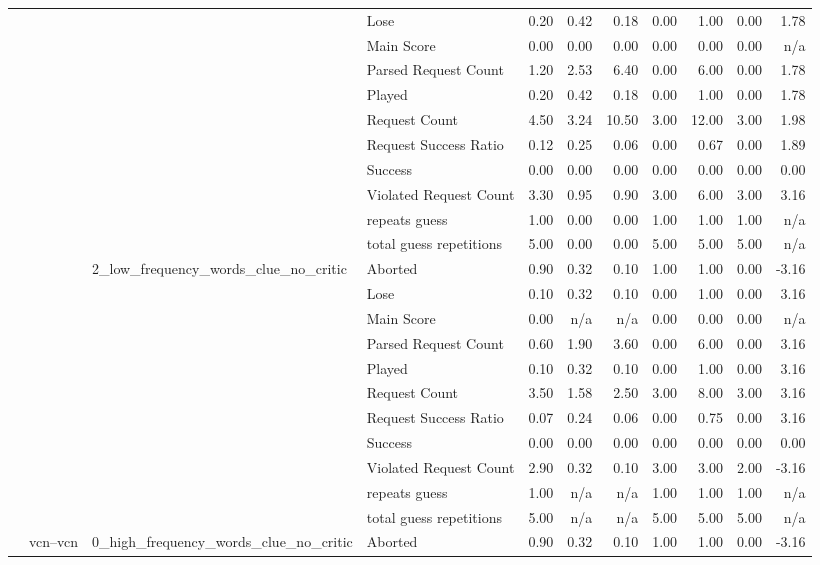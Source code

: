 \begin{tabular}{llllrrrrrrr}
 &  &  & Lose & 0.20 & 0.42 & 0.18 & 0.00 & 1.00 & 0.00 & 1.78 \\
 &  &  & Main Score & 0.00 & 0.00 & 0.00 & 0.00 & 0.00 & 0.00 & n/a \\
 &  &  & Parsed Request Count & 1.20 & 2.53 & 6.40 & 0.00 & 6.00 & 0.00 & 1.78 \\
 &  &  & Played & 0.20 & 0.42 & 0.18 & 0.00 & 1.00 & 0.00 & 1.78 \\
 &  &  & Request Count & 4.50 & 3.24 & 10.50 & 3.00 & 12.00 & 3.00 & 1.98 \\
 &  &  & Request Success Ratio & 0.12 & 0.25 & 0.06 & 0.00 & 0.67 & 0.00 & 1.89 \\
 &  &  & Success & 0.00 & 0.00 & 0.00 & 0.00 & 0.00 & 0.00 & 0.00 \\
 &  &  & Violated Request Count & 3.30 & 0.95 & 0.90 & 3.00 & 6.00 & 3.00 & 3.16 \\
 &  &  & repeats guess & 1.00 & 0.00 & 0.00 & 1.00 & 1.00 & 1.00 & n/a \\
 &  &  & total guess repetitions & 5.00 & 0.00 & 0.00 & 5.00 & 5.00 & 5.00 & n/a \\
\cline{3-11}
 &  & \multirow[t]{11}{*}{2_low_frequency_words_clue_no_critic} & Aborted & 0.90 & 0.32 & 0.10 & 1.00 & 1.00 & 0.00 & -3.16 \\
 &  &  & Lose & 0.10 & 0.32 & 0.10 & 0.00 & 1.00 & 0.00 & 3.16 \\
 &  &  & Main Score & 0.00 & n/a & n/a & 0.00 & 0.00 & 0.00 & n/a \\
 &  &  & Parsed Request Count & 0.60 & 1.90 & 3.60 & 0.00 & 6.00 & 0.00 & 3.16 \\
 &  &  & Played & 0.10 & 0.32 & 0.10 & 0.00 & 1.00 & 0.00 & 3.16 \\
 &  &  & Request Count & 3.50 & 1.58 & 2.50 & 3.00 & 8.00 & 3.00 & 3.16 \\
 &  &  & Request Success Ratio & 0.07 & 0.24 & 0.06 & 0.00 & 0.75 & 0.00 & 3.16 \\
 &  &  & Success & 0.00 & 0.00 & 0.00 & 0.00 & 0.00 & 0.00 & 0.00 \\
 &  &  & Violated Request Count & 2.90 & 0.32 & 0.10 & 3.00 & 3.00 & 2.00 & -3.16 \\
 &  &  & repeats guess & 1.00 & n/a & n/a & 1.00 & 1.00 & 1.00 & n/a \\
 &  &  & total guess repetitions & 5.00 & n/a & n/a & 5.00 & 5.00 & 5.00 & n/a \\
\cline{2-11} \cline{3-11}
 & \multirow[t]{33}{*}{vcn--vcn} & \multirow[t]{11}{*}{0_high_frequency_words_clue_no_critic} & Aborted & 0.90 & 0.32 & 0.10 & 1.00 & 1.00 & 0.00 & -3.16 \\

\end{tabular}
